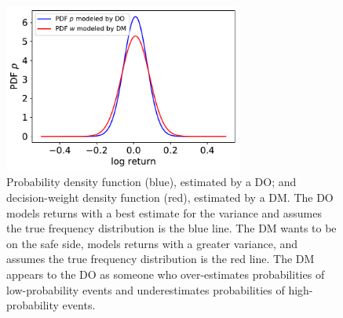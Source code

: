 \documentclass[11pt]{article}
\newcommand{\flabel}[1]{\label{fig:#1}}
\numberwithin{equation}{section}
\begin{document}
\begin{figure}[!htb]
\centering
\includegraphics[width=0.7\textwidth]{./figs/probability_dists.pdf}
\caption{Probability density function (blue), estimated by a DO; and decision-weight density function (red), estimated by a DM. The DO models returns with a best estimate for the variance and assumes the true frequency distribution is the blue line. The DM wants to be on the safe side, models returns with a greater variance, and assumes the true frequency distribution is the red line. The DM appears to the DO as someone who over-estimates probabilities of low-probability events and underestimates probabilities of high-probability events.}
\flabel{probability_dists}
\end{figure}
\end{document}
